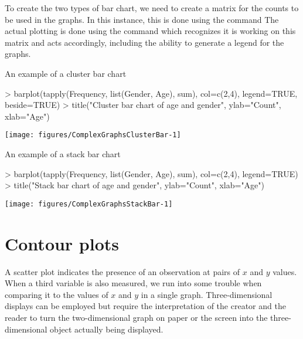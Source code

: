 To create the two types of bar chart, we need to create a matrix for the counts to be used in the graphs. In this instance, this is done using the  command The actual plotting is done using the  command which recognizes it is working on this matrix and acts accordingly, including the ability to generate a legend for the graphs. 
\begin{exhibit} 
\begin{center} 
\caption{An example of a cluster bar chart} 
\label{ClusterBarChart} 

\begin{Schunk}
\begin{Sinput}
> barplot(tapply(Frequency, list(Gender, Age), sum), col=c(2,4), legend=TRUE, beside=TRUE) 
> title("Cluster bar chart of age and gender", ylab="Count", xlab="Age") 
\end{Sinput}

\texttt{[image: figures/ComplexGraphsClusterBar-1]} \end{Schunk}

\end{center} 
\end{exhibit} 
\begin{exhibit} 
\begin{center} 
\caption{An example of a stack bar chart} 
\label{StackBarChart} 

\begin{Schunk}
\begin{Sinput}
> barplot(tapply(Frequency, list(Gender, Age), sum), col=c(2,4), legend=TRUE) 
> title("Stack bar chart of age and gender", ylab="Count", xlab="Age") 
\end{Sinput}

\texttt{[image: figures/ComplexGraphsStackBar-1]} \end{Schunk}

\end{center} 
\end{exhibit} 
 
 
 
\section{Contour plots} 
 
A scatter plot indicates the presence of an observation at pairs of $x$ and $y$ values. When a third variable is also measured, we run into some trouble when comparing it to the values of $x$ and $y$ in a single graph. Three-dimensional displays can be employed but require the interpretation of the creator and the reader to turn the two-dimensional graph on paper or the screen into the three-dimensional object actually being displayed. 
 
